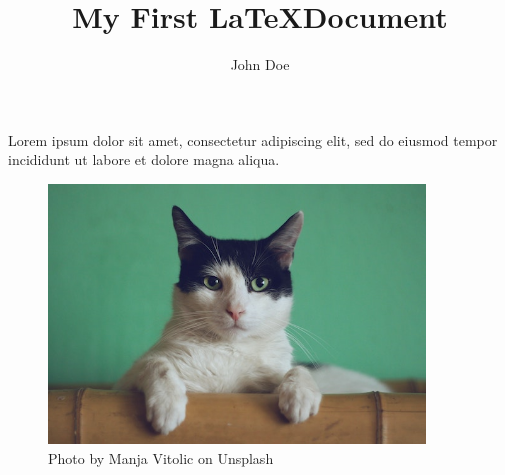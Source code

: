 \documentclass[11pt, a4paper]{report}
\title{My First \LaTeX Document}
\author{John Doe}
\begin{document}
\maketitle

Lorem ipsum dolor sit amet, consectetur adipiscing elit,
sed do eiusmod tempor incididunt ut labore et dolore magna aliqua.

\begin{figure}[h]
	\centering
	\includegraphics[width=10cm]{cat}
	\caption{Photo by Manja Vitolic on Unsplash}
\end{figure}
\end{document}
